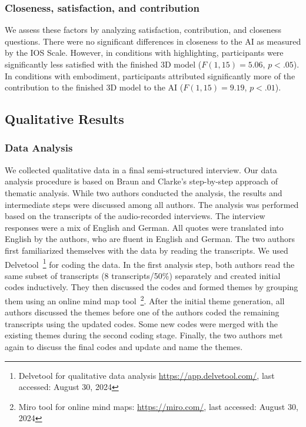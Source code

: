 \subsubsection{Closeness, satisfaction, and contribution}
We assess these factors by analyzing satisfaction, contribution, and closeness questions.
There were no significant differences in closeness to the AI as measured by the IOS Scale. However, in conditions with highlighting, participants were significantly less satisfied with the finished 3D model ($F(1, 15)=5.06$, $p<.05$). In conditions with embodiment, participants attributed significantly more of the contribution to the finished 3D model to the AI ($F(1, 15)=9.19$, $p<.01$).

\subsection{Qualitative Results}
\subsubsection{Data  Analysis}
We collected qualitative data in a final semi-structured interview.
Our data analysis procedure is based on Braun and Clarke's \cite{braun_using_2006} step-by-step approach of thematic analysis.
While two authors conducted the analysis, the results and intermediate steps were discussed among all authors.
The analysis was performed based on the transcripts of the audio-recorded interviews. The interview responses were a mix of English and German. All quotes were translated into English by the authors, who are fluent in English and German.
The two authors first familiarized themselves with the data by reading the transcripts. 
We used Delvetool~\footnote{Delvetool for qualitative data analysis \url{https://app.delvetool.com/}, last accessed: August 30, 2024} for coding the data.
In the first analysis step, both authors read the same subset of transcripts (8 transcripts/50\%) separately and created initial codes inductively. They then discussed the codes and formed themes by grouping them using an online mind map tool~\footnote{Miro tool for online mind maps: \url{https://miro.com/}, last accessed: August 30, 2024}. After the initial theme generation, all authors discussed the themes before one of the authors coded the remaining transcripts using the updated codes. Some new codes were merged with the existing themes during the second coding stage. Finally, the two authors met again to discuss the final codes and update and name the themes.


